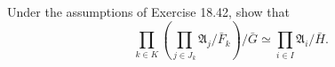 Under the assumptions of Exercise 18.42, show that
$$\prod_{k \in K} \left( \prod_{j \in J_k} \mathfrak{A}_j / \bar{F}_k \right) / \bar{G} \simeq \prod_{i \in I} \mathfrak{A}_i / \bar{H}.$$
